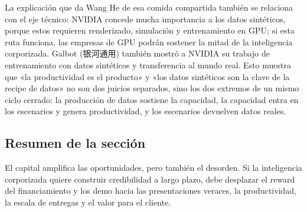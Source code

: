 La explicación que da Wang He de esa comida compartida también se relaciona con el eje técnico: NVIDIA concede mucha importancia a los datos sintéticos, porque estos requieren renderizado, simulación y entrenamiento en GPU; si esta ruta funciona, las empresas de GPU podrán sostener la mitad de la inteligencia corporizada. Galbot (银河通用) también mostró a NVIDIA su trabajo de entrenamiento con datos sintéticos y transferencia al mundo real. Esto muestra que «la productividad es el producto» y «los datos sintéticos son la clave de la recipe de datos» no son dos juicios separados, sino los dos extremos de un mismo ciclo cerrado: la producción de datos sostiene la capacidad, la capacidad entra en los escenarios y genera productividad, y los escenarios devuelven datos reales.

\subsection{Resumen de la sección}

El capital amplifica las oportunidades, pero también el desorden. Si la inteligencia corporizada quiere construir credibilidad a largo plazo, debe desplazar el reward del financiamiento y los demo hacia las presentaciones veraces, la productividad, la escala de entregas y el valor para el cliente.
